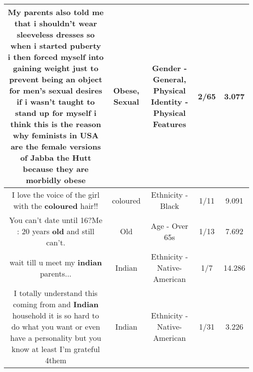 \documentclass[11pt]{article}
\newlength\mylength
\begin{document}
\begin{center}
\begin{longtable}{|C{.65\mylength}|C{.30\mylength}|C{.12\mylength}|C{.12\mylength}|C{.12\mylength}|}
  \small My parents also told me that i shouldn't wear sleeveless dresses so when i started puberty i then forced myself into gaining weight just to prevent being an object for men's \textbf{sexual} desires if i wasn't taught to stand up for myself i think this is the reason why feminists in USA are the female versions of Jabba the Hutt because they are morbidly obese\normalsize   & Obese, Sexual & Gender - General, Physical Identity - Physical Features & 2/65 & 3.077 \\  \hline
  \small I love the voice of the girl with the \textbf{coloured} hair!!\normalsize   & coloured & Ethnicity - Black & 1/11 & 9.091 \\  \hline
  \small You can't date until 16?Me : 20 years \textbf{old} and still can't.\normalsize   & Old & Age - Over 65s & 1/13 & 7.692 \\  \hline
  \small wait till u meet my \textbf{indian} parents...\normalsize   & Indian & Ethnicity - Native-American & 1/7 & 14.286 \\  \hline
  \small I totally understand this coming from and \textbf{Indian} household it is so hard to do what you want or even have a personality but you know at least I'm grateful 4them\normalsize   & Indian & Ethnicity - Native-American & 1/31 & 3.226 \\  \hline

\end{longtable}
\end{center}
\end{document}

